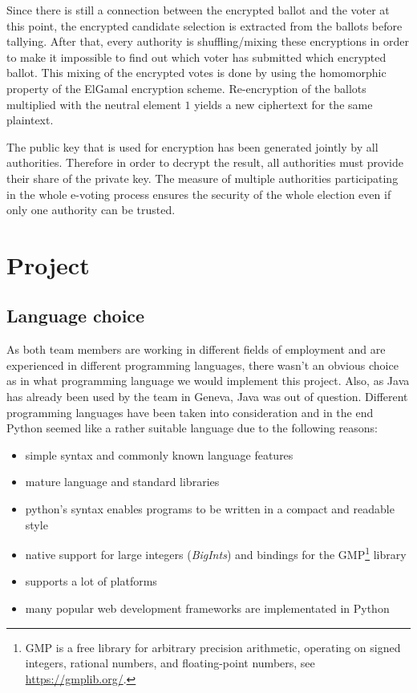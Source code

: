 \documentclass[a4paper,12pt]{report}
\begin{document}
Since there is still a connection between the encrypted ballot and the voter at this point, the encrypted candidate selection is extracted from the ballots before tallying. After that, every authority is shuffling/mixing these encryptions in order to make it impossible to find out which voter has submitted which encrypted ballot. This mixing of the encrypted votes is done by using the homomorphic property of the ElGamal encryption scheme. Re-encryption of the ballots multiplied with the neutral element $1$ yields a new ciphertext for the same plaintext.

The public key that is used for encryption has been generated jointly by all authorities. Therefore in order to decrypt the result, all authorities must provide their share of the private key. The measure of multiple authorities participating in the whole e-voting process ensures the security of the whole election even if only one authority can be trusted.

\chapter{Project}
\section{Language choice}
As both team members are working in different fields of employment and are experienced in different programming languages, there wasn't an obvious choice as in what programming language we would implement this project. Also, as Java has already been used by the team in Geneva, Java was out of question. Different programming languages have been taken into consideration and in the end Python seemed like a rather suitable language due to the following reasons:

\begin{itemize}
	\item simple syntax and commonly known language features
	\item mature language and standard libraries
	\item python's syntax enables programs to be written in a compact and readable style
	\item native support for large integers (\textit{BigInts}) and bindings for the GMP\footnote{GMP is a free library for arbitrary precision arithmetic, operating on signed integers, rational numbers, and floating-point numbers, see \url{https://gmplib.org/}.} library
	\item supports a lot of platforms
	\item many popular web development frameworks are implementated in Python
\end{itemize}
\end{document}

